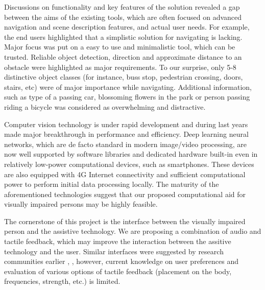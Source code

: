\documentclass[10pt,conference,compsocconf]{IEEEtran}
\begin{document}
Discussions on functionality and key features of the solution revealed a gap between the aims of the existing tools, which are often focused on advanced navigation and scene description features, and actual user needs. For example, the end users highlighted that a simplistic solution for navigating is lacking. 
Major focus was put on a easy to use and minimalistic tool, which can be trusted. Reliable object detection, direction and approximate distance to an obstacle were highlighted as major requirements. To our surprise, only 5-8 distinctive object classes (for instance, buss stop, pedestrian crossing, doors, stairs, etc) were of major importance while navigating. Additional information, such as type of a passing car, blossoming flowers in the park or person passing riding a bicycle was considered as overwhelming and distractive. 


Computer vision technology is under rapid development and during last years made major breakthrough in performance and efficiency. Deep learning neural networks, which are de facto standard in modern image/video processing, are now well supported by software libraries and dedicated hardware built-in even in relatively low-power computational devices, such as smartphones. These devices are also equipped with 4G Internet connectivity and sufficient computational power to perform initial data processing locally. The maturity of the aforementioned technologies suggest that our proposed computational aid for visually impaired persons may be highly feasible. 


The cornerstone of this project is the interface between the visually impaired person and the assistive technology. We are proposing a combination of audio and tactile feedback, which may improve the interaction between the assitive technology and the user. Similar interfaces were suggested by research communities earlier \cite{Zientara}, \cite{Poggi}, however, current knowledge on user preferences and evaluation of various options of tactile feedback (placement on the body, frequencies, strength, etc.) is limited. 
\end{document}
